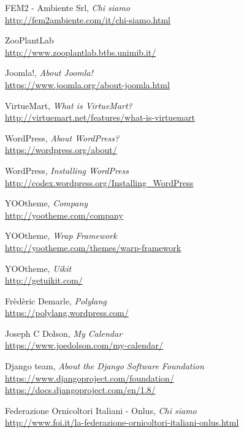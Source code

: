 \begin{thebibliography}{99}

	FEM2 - Ambiente Srl, \emph{Chi siamo} \\
	\url{http://fem2ambiente.com/it/chi-siamo.html}

	ZooPlantLab \\
	\url{http://www.zooplantlab.btbs.unimib.it/}

	Joomla!, \emph{About Joomla!} \\
	\url{https://www.joomla.org/about-joomla.html}

	VirtueMart, \emph{What is VirtueMart?} \\
	\url{http://virtuemart.net/features/what-is-virtuemart}
	
	WordPress, \emph{About WordPress?} \\
	\url{https://wordpress.org/about/}
	
	WordPress, \emph{Installing WordPress} \\
	\url{http://codex.wordpress.org/Installing_WordPress}	
	
	YOOtheme, \emph{Company} \\
	\url{http://yootheme.com/company}	

	YOOtheme, \emph{Wrap Framework} \\
	\url{http://yootheme.com/themes/warp-framework}	
	
	YOOtheme, \emph{Uikit} \\
	\url{http://getuikit.com/}	

	Frèdèric Demarle, \emph{Polylang} \\
	\url{https://polylang.wordpress.com/}	

	Joseph C Dolson, \emph{My Calendar} \\
	\url{https://www.joedolson.com/my-calendar/}

	Django team, \emph{About the Django Software Foundation} \\
	\url{https://www.djangoproject.com/foundation/} \\
	\url{https://docs.djangoproject.com/en/1.8/}

	Federazione Ornicoltori Italiani - Onlus, \emph{Chi siamo} \\
	\url{http://www.foi.it/la-federazione-ornicoltori-italiani-onlus.html}


\end{thebibliography}
